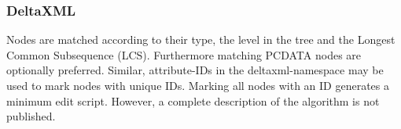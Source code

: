 


\subsubsection{DeltaXML\cite{DELTAXML}}
Nodes are matched according to their type, the level in the tree and the Longest Common Subsequence (LCS). Furthermore matching PCDATA nodes are optionally preferred. Similar, attribute-IDs in the deltaxml-namespace may be used to mark nodes with unique IDs. Marking all nodes with an ID generates a minimum edit script. However, a complete description of the algorithm is not published.

